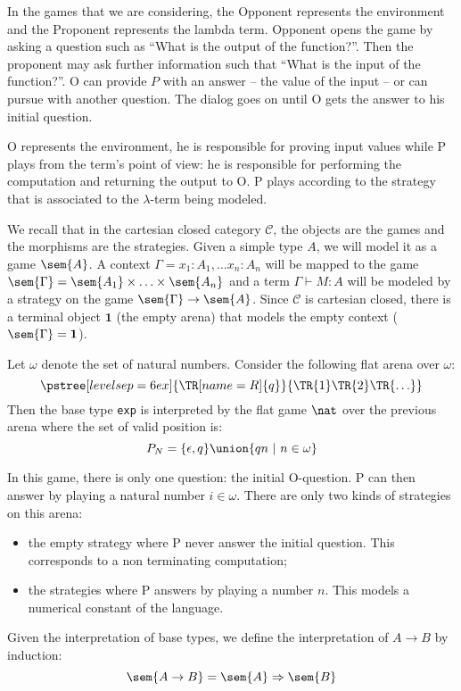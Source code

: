 In the games that we are considering, the Opponent represents the
environment and the Proponent represents the lambda term. Opponent
opens the game by asking a question such as ``What is the output of
the function?''. Then the proponent may ask further information
such that ``What is the input of the function?''. O can provide
$P$ with an answer -- the value of the input -- or can pursue with
another question. The dialog goes on until O gets the answer to his
initial question.

O represents the environment, he is responsible for proving input
values while P plays from the term's point of view: he is
responsible for performing the computation and returning the output
to O. P plays according to the strategy that is associated to the
$\lambda$-term being modeled.

We recall that in the cartesian closed category $\mathcal{C}$, the
objects are the games and the morphisms are the strategies. Given a
simple type $A$, we will model it as a game $\sem{A}$. A context
$\Gamma = x_1 :A_1, \ldots x_n:A_n$ will be mapped to the game
$\sem{\Gamma} = \sem{A_1} \times \ldots \times \sem{A_n}$ and a term
$\Gamma \vdash M : A$ will be modeled by a strategy on the game
$\sem{\Gamma} \rightarrow \sem{A}$. Since $\mathcal{C}$ is cartesian
closed, there is a terminal object $\textbf{1}$ (the empty arena)
that models the empty context ($\sem{\Gamma} = \textbf{1}$).


Let $\omega$ denote the set of natural numbers. Consider the
following flat arena over $\omega$:
$$  \pstree[levelsep=6ex]{\TR[name=R]{q}}
    { \TR{1} \TR{2} \TR{\ldots}
    }
$$
Then the base type \texttt{exp} is interpreted by the flat game
$\nat$ over the previous arena where the set of valid position is:
$$P_N = \{ \epsilon, q \} \union \{ qn \ | \ n \in \omega \}$$


In this game, there is only one question: the initial O-question. P
can then answer by playing a natural number $i \in \omega$. There
are only two kinds of strategies on this arena:
\begin{itemize}
\item the empty strategy where P never answer the initial question. This corresponds to a non terminating computation;
\item the strategies where P answers by playing a number $n$. This models a numerical constant of the language.
\end{itemize}

Given the interpretation of base types, we define the interpretation
of $A\rightarrow B$ by induction:
$$\sem{A \rightarrow B} = \sem{A} \Rightarrow \sem{B}$$

